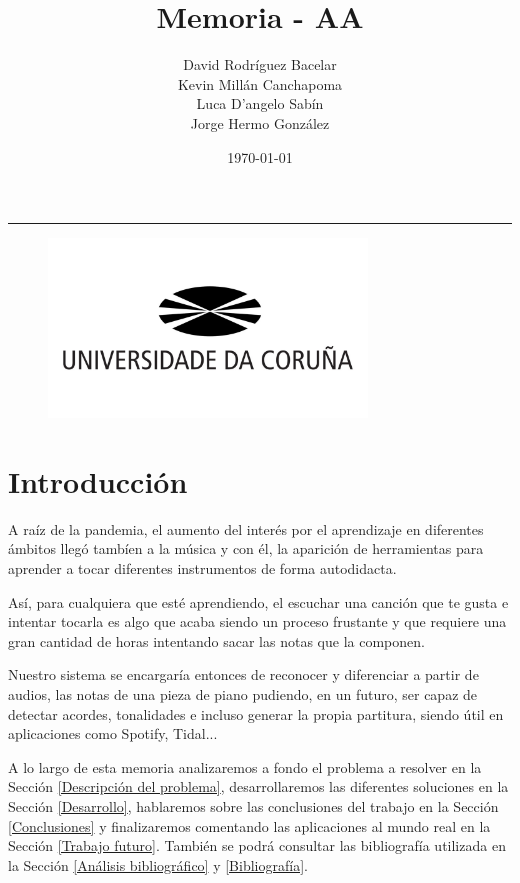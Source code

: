 \documentclass[12pt]{article}
\title{\textbf{\huge Memoria - AA}}
\author{{David Rodríguez Bacelar} \\[0.25cm] {Kevin Millán Canchapoma} \\[0.25cm]{Luca D'angelo Sabín} \\[0.25cm]{Jorge Hermo González}}
\date{\today}
\newcommand{\HRule}{\rule{\linewidth}{0.5mm}}
\begin{document}
\maketitle
\HRule
\bigskip\bigskip\bigskip\bigskip\bigskip\bigskip
\begin{figure}[h!]
	\centering
	\includegraphics[height=180px]{udc.jpg}
	\label{fig:diagram1}
\end{figure}

\newpage

\tableofcontents

\newpage
\section{Introducción}

A raíz de la pandemia, el aumento del interés por el aprendizaje en diferentes ámbitos llegó tambíen a la música y con él, la aparición
de herramientas para aprender a tocar diferentes instrumentos de forma autodidacta.

\bigskip
Así, para cualquiera que esté aprendiendo, el escuchar una canción que te gusta e intentar tocarla es algo que acaba siendo un proceso
frustante y que requiere una gran cantidad de horas intentando sacar las notas que la componen.

\bigskip
Nuestro sistema se encargaría entonces de reconocer y diferenciar a partir de audios, las notas de una pieza de piano
pudiendo, en un futuro, ser capaz de detectar acordes, tonalidades e incluso generar la propia partitura, siendo útil en aplicaciones como Spotify, Tidal...

\bigskip
A lo largo de esta memoria analizaremos a fondo el problema a resolver en la Sección \ref{Descripción del problema}, desarrollaremos las diferentes soluciones en la
Sección \ref{Desarrollo}, hablaremos sobre las conclusiones del trabajo en la Sección \ref{Conclusiones} y finalizaremos comentando las aplicaciones al mundo
real en la Sección \ref{Trabajo futuro}. También se podrá consultar las bibliografía utilizada en la Sección \ref{Análisis bibliográfico} y \ref{Bibliografía}.
\end{document}
